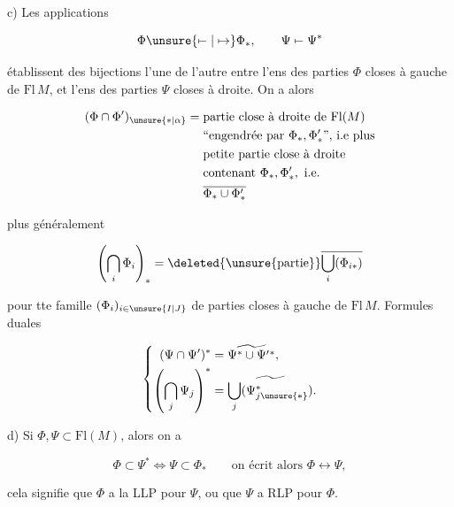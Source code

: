 



c) Les applications

\[ \Phi\unsure{\mapstochar\relbar|\mapsto}\Phi_*,\qquad\Psi\mapstochar\relbar\Psi^* \]

établissent des bijections  l'une de l'autre entre l'ens \deleted{\unsure{$\Phi$}}des parties $\Phi$ closes à gauche de $\mathrm{Fl}\,M$, et l'ens des parties $\Psi$ closes à droite.  On a alors

\[ \begin{aligned}(\Phi\cap\Phi')_{\unsure{*|\alpha}}={}&\text{partie close à droite de }\mathrm{Fl}(M)\\ &\text{``engendrée par }\Phi_*,\Phi'_* \text{'', i.e plus}\\ &\text{petite partie close à droite}\\ &\text{contenant }\Phi_*,\Phi'_*,\ \text{i.e.}\\ &\overline{\Phi_*\cup\Phi'_*}\end{aligned} \]

plus généralement

\[ \left(\bigcap_i\Phi_i\right)_*=\deleted{\text{\unsure{partie}}}\overline{\bigcup_i(\Phi_{i*})} \]

pour tte famille $(\Phi_i)_{i\in\unsure{I|J}}$ de parties closes à gauche de $\mathrm{Fl}\,M$. Formules duales

\[ \left\{\begin{aligned}(\Psi\cap\Psi')^*&=\widetilde{\Psi^*\cup\Psi'{}^*},\\ \left(\bigcap_j\Psi_j\right)^*&=\widetilde{\bigcup_j(\Psi_{j\unsure{*}}^{*})}.\end{aligned}\right. \]

d) Si $\Phi,\Psi\subset\mathrm{Fl}(M)$, alors on a

\[ \Phi\subset\Psi^*\Longleftrightarrow\Psi\subset\Phi_*\qquad\text{on écrit alors }\Phi\longleftrightarrow\Psi, \]

cela signifie que $\Phi$ a la LLP pour $\Psi$, ou que $\Psi$ a  RLP pour $\Phi$.




